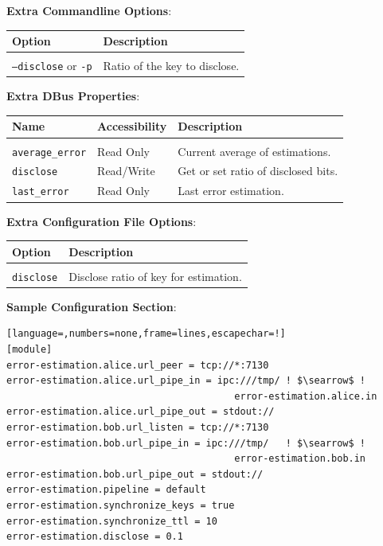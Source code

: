 \bigskip

\noindent \textbf{Extra Commandline Options}:

\medskip

\begin{tabular}{lp{10cm}}

Option                              & Description \\
\hline
\\
\texttt{--disclose} or \texttt{-p}  & Ratio of the key to disclose. \\ [0.5em]

\end{tabular}

\bigskip

\noindent \textbf{Extra DBus Properties}:

\medskip

\begin{tabular}{llp{7cm}}

Name                    & Accessibility &   Description \\
\hline
\\
\texttt{average\_error} & Read Only     &   Current average of estimations. \\ [0.5em]
\texttt{disclose}       & Read/Write    &   Get or set ratio of disclosed bits. \\ [0.5em]
\texttt{last\_error}    & Read Only     &   Last error estimation. \\ [0.5em]

\end{tabular}

\bigskip

\noindent \textbf{Extra Configuration File Options}:

\medskip

\begin{tabular}{lp{9cm}}

Option                      & Description \\
\hline
\\
\texttt{disclose}           & Disclose ratio of key for estimation. \\ [0.5em]

\end{tabular}

\bigskip

\noindent \textbf{Sample Configuration Section}: 

\medskip

\begin{lstlisting}[language=,numbers=none,frame=lines,escapechar=!]
[module]
error-estimation.alice.url_peer = tcp://*:7130
error-estimation.alice.url_pipe_in = ipc:///tmp/ ! $\searrow$ !
                                        error-estimation.alice.in
error-estimation.alice.url_pipe_out = stdout://
error-estimation.bob.url_listen = tcp://*:7130
error-estimation.bob.url_pipe_in = ipc:///tmp/   ! $\searrow$ !
                                        error-estimation.bob.in
error-estimation.bob.url_pipe_out = stdout://
error-estimation.pipeline = default
error-estimation.synchronize_keys = true
error-estimation.synchronize_ttl = 10
error-estimation.disclose = 0.1
\end{lstlisting}


